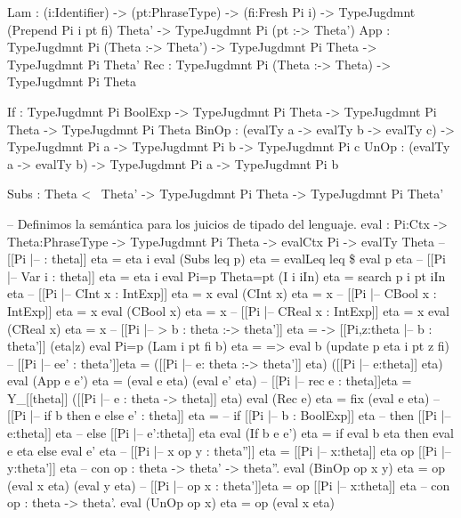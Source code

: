 \begin{code}
        Lam   : (i:Identifier) -> (pt:PhraseType) -> (fi:Fresh Pi i) ->
                TypeJugdmnt (Prepend Pi i pt fi) Theta' -> 
                TypeJugdmnt Pi (pt :-> Theta')
        App   : TypeJugdmnt Pi (Theta :-> Theta') -> TypeJugdmnt Pi Theta -> 
                TypeJugdmnt Pi Theta'
        Rec   : TypeJugdmnt Pi (Theta :-> Theta) -> TypeJugdmnt Pi Theta
        
        If    : TypeJugdmnt Pi BoolExp -> TypeJugdmnt Pi Theta -> 
                TypeJugdmnt Pi Theta -> TypeJugdmnt Pi Theta
        BinOp : (evalTy a -> evalTy b -> evalTy c) -> 
                TypeJugdmnt Pi a -> TypeJugdmnt Pi b -> TypeJugdmnt Pi c
        UnOp  : (evalTy a -> evalTy b) -> TypeJugdmnt Pi a -> TypeJugdmnt Pi b
        
        Subs    : Theta <~ Theta' -> TypeJugdmnt Pi Theta -> TypeJugdmnt Pi Theta'

-- Definimos la semántica para los juicios de tipado del lenguaje.
eval : {Pi:Ctx} -> {Theta:PhraseType} ->
       TypeJugdmnt Pi Theta -> evalCtx Pi -> evalTy Theta
-- [[Pi |--  : theta]] eta = eta i
eval (Subs leq p) eta = evalLeq leq \$ eval p eta
-- [[Pi |-- Var i : theta]] eta = eta i
eval {Pi=p} {Theta=pt} (I i iIn) eta = search p i pt iIn eta
-- [[Pi |-- CInt x : IntExp]] eta = x
eval (CInt x)    eta = x
-- [[Pi |-- CBool x : IntExp]] eta = x
eval (CBool x)    eta = x
-- [[Pi |-- CReal x : IntExp]] eta = x
eval (CReal x)    eta = x
-- [[Pi |-- \-> b : theta :-> theta']] eta = \z -> [[Pi,z:theta |-- b : theta']] (eta|z)
eval {Pi=p} (Lam i pt fi b) eta = \z => eval b (update p eta i pt z fi)
-- [[Pi |-- ee' : theta']]eta = ([[Pi |-- e: theta :-> theta']] eta) ([[Pi |-- e:theta]] eta)
eval (App e e')   eta = (eval e eta) (eval e' eta)
-- [[Pi |-- rec e : theta]]eta = Y_[[theta]] ([[Pi |-- e : theta -> theta]] eta)
eval (Rec e) eta = fix (eval e eta)
-- [[Pi |-- if b then e else e' : theta]] eta = 
--                  if [[Pi |-- b : BoolExp]] eta 
--                     then [[Pi |-- e:theta]] eta 
--                     else [[Pi |-- e':theta]] eta 
eval (If b e e')  eta = if eval b eta then eval e eta else eval e' eta
-- [[Pi |-- x op y : theta'']] eta = [[Pi |-- x:theta]] eta op [[Pi |-- y:theta']] eta
-- con op : theta -> theta' -> theta''.
eval (BinOp op x y) eta = op (eval x eta) (eval y eta)
-- [[Pi |-- op x : theta']]eta = op [[Pi |-- x:theta]] eta
-- con op : theta -> theta'.
eval (UnOp op x) eta = op (eval x eta)

\end{code}
